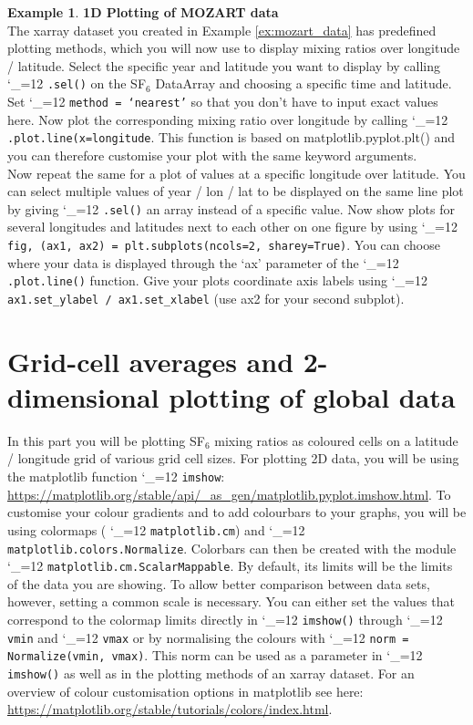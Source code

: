 \documentclass{article}
\makeatletter
\newcommand{\pyf}{%
  \begingroup\catcode`_=12
  \pyf@
}
\newcommand{\pyf@}[1]{\texttt{#1}\endgroup}
\theoremstyle{definition}
\newtheorem{exmp}{Example}[section]
\makeatother
\begin{document}
\begin{exmp}\textbf{1D Plotting of MOZART data} \\
The xarray dataset you created in Example \ref{ex:mozart_data} has predefined plotting methods, which you will now use to display mixing ratios over longitude / latitude. Select the specific year and latitude you want to display by calling \pyf{.sel()} on the SF$_6$ DataArray and choosing a specific time and latitude. Set \pyf{method = `nearest'} so that you don't have to input exact values here. Now plot the corresponding mixing ratio over longitude by calling \pyf{.plot.line(x=longitude}. This function is based on matplotlib.pyplot.plt() and you can therefore customise your plot with the same keyword arguments. \\

Now repeat the same for a plot of values at a specific longitude over latitude. You can select multiple values of year / lon / lat to be displayed on the same line plot by giving \pyf{.sel()} an array instead of a specific value. Now show plots for several longitudes and latitudes next to each other on one figure by using \pyf{fig, (ax1, ax2) = plt.subplots(ncols=2, sharey=True)}. You can choose where your data is displayed through the `ax' parameter of the \pyf{.plot.line()} function. Give your plots coordinate axis labels using \pyf{ax1.set_ylabel / ax1.set_xlabel} (use ax2 for your second subplot).\end{exmp}

\section{Grid-cell averages and 2-dimensional plotting of global data}
In this part you will be plotting SF$_6$ mixing ratios as coloured cells on a latitude / longitude grid of various grid cell sizes. For plotting 2D data, you will be using the matplotlib function \pyf{imshow}: \url{https://matplotlib.org/stable/api/_as_gen/matplotlib.pyplot.imshow.html}. To customise your colour gradients and to add colourbars to your graphs, you will be using colormaps (\pyf{matplotlib.cm}) and \pyf{matplotlib.colors.Normalize}. Colorbars can then be created with the module \linebreak \pyf{matplotlib.cm.ScalarMappable}. By default, its limits will be the limits of the data you are showing. To allow better comparison between data sets, however, setting a common scale is necessary. You can either set the values that correspond to the colormap limits directly in \pyf{imshow()} through \pyf{vmin} and \pyf{vmax} or by normalising the colours with \pyf{norm = Normalize(vmin, vmax)}. This norm can be used as a parameter in \pyf{imshow()} as well as in the plotting methods of an xarray dataset. For an overview of colour customisation options in matplotlib see here: \url{https://matplotlib.org/stable/tutorials/colors/index.html}. 
\end{document}
